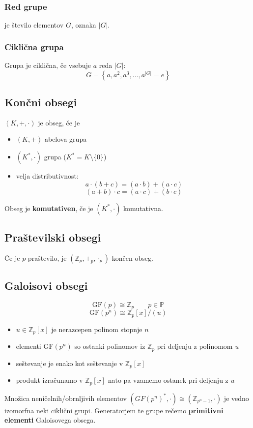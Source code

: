 \begin{multicols}{4}
\subsubsection{Red grupe}
je število elementov $G$, oznaka $|G|$.

\subsubsection*{Ciklična grupa}
Grupa je ciklična, če vsebuje $a$ reda $|G|$:
\[ G = \left\{ a, a^2, a^3, \dots, a^{|G|} = e\right\}\]

\subsection*{Končni obsegi}
$(K, +,\cdot)$ je obseg, če je
\begin{itemize}
	\item $(K, +)$ abelova grupa
	\item $(K^*, \cdot)$ grupa ($K^* = K \setminus \{0\}$)
	\item velja distributivnost:
	\[ a \cdot (b+c) = (a\cdot b) + (a \cdot c)\]
	\[ (a+b) \cdot c = (a\cdot c) + (b \cdot c)\]
\end{itemize}

Obseg je \textbf{komutativen}, če je $(K^*, \cdot)$ komutativna.

\subsection*{Praštevilski obsegi}
Če je $p$ praštevilo, je $(\mathbb{Z}_p, +_p, \cdot_p)$ končen obseg.


\subsection*{Galoisovi obsegi}
\[\text{GF}(p) \cong \mathbb{Z}_p \qquad p \in \mathbb{P}\]
\[ \text{GF}(p^n) \cong \mathbb{Z}_p[x]/(u) \]
\begin{itemize}
	\item $u \in \mathbb{Z}_p[x]$ je nerazcepen polinom stopnje $n$
	\item elementi $\text{GF}(p^n)$ so ostanki polinomov iz $\mathbb{Z}_p$ pri deljenju z polinomom $u$
	\item seštevanje je enako kot seštevanje v $\mathbb{Z}_p[x]$
	\item produkt izračunamo v $\mathbb{Z}_p[x]$ nato pa vzamemo ostanek pri deljenju z $u$
\end{itemize}

Množica neničelnih/obrnljivih elementov $(GF(p^n)^*, \cdot) \cong (\mathbb{Z}_{p^n-1}, \cdot)$ je vedno izomorfna neki ciklični grupi.
Generatorjem te grupe rečemo \textbf{primitivni elementi} Galoisovega obsega.

\end{multicols}
